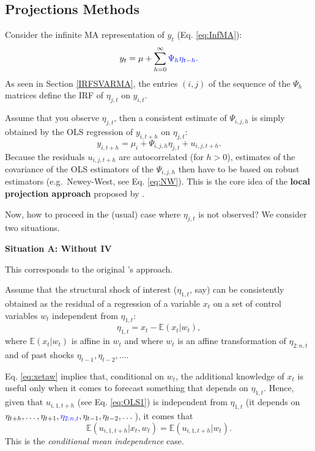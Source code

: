 \documentclass[
]{book}
\theoremstyle{definition}
\theoremstyle{definition}
\theoremstyle{definition}
\theoremstyle{definition}
\theoremstyle{remark}
\begin{document}
\hypertarget{Projections}{%
\subsection{Projections Methods}\label{Projections}}

Consider the infinite MA representation of \(y_t\) (Eq. \eqref{eq:InfMA}):
\[
y_t = \mu + \sum_{h=0}^\infty \color{blue}{\Psi_{h}} \eta_{t-h}.
\]
As seen in Section \ref{IRFSVARMA}, the entries \((i,j)\) of the sequence of the \(\Psi_h\) matrices define the IRF of \(\eta_{j,t}\) on \(y_{i,t}\).

Assume that you observe \(\eta_{j,t}\), then a consistent estimate of \(\Psi_{i,j,h}\) is simply obtained by the OLS regression of \(y_{i,t+h}\) on \(\eta_{j,t}\):
\begin{equation}
y_{i,t+h} = \mu_i + \Psi_{i,j,h}\eta_{j,t} + u_{i,j,t+h}.\label{eq:OLS1}
\end{equation}
Because the residuals \(u_{i,j,t+h}\) are autocorrelated (for \(h>0\)), estimates of the covariance of the OLS estimators of the \(\Psi_{i,j,h}\) then have to be based on robust estimators (e.g.~Newey-West, see Eq. \eqref{eq:NW}). This is the core idea of the \textbf{local projection approach} proposed by \citet{Jorda_2005}.

Now, how to proceed in the (usual) case where \(\eta_{j,t}\) is not observed? We consider two situations.

\textbf{Situation A: Without IV}

This corresponds to the original \citet{Jorda_2005}'s approach.

Assume that the structural shock of interest (\(\eta_{1,t}\), say) can be consistently obtained as the residual of a regression of a variable \(x_t\) on a set of control variables \(w_t\) independent from \(\eta_{1,t}\):
\begin{equation}
\eta_{1,t} = x_t - \mathbb{E}(x_t|w_t),\label{eq:xetaw}
\end{equation}
where \(\mathbb{E}(x_t|w_t)\) is affine in \(w_t\) and where \(w_t\) is an affine transformation of \(\eta_{2:n,t}\) and of past shocks \(\eta_{t-1},\eta_{t-2},\dots\).

Eq. \eqref{eq:xetaw} implies that, conditional on \(w_t\), the additional knowledge of \(x_t\) is useful only when it comes to forecast something that depends on \(\eta_{1,t}\). Hence, given that \(u_{i,1,t+h}\) (see Eq. \eqref{eq:OLS1}) is independent from \(\eta_{1,t}\) (it depends on \(\eta_{t+h},\dots,\eta_{t+1},{\color{blue}\eta_{2:n,t}},\eta_{t-1},\eta_{t-2},\dots\)), it comes that
\[
\mathbb{E}(u_{i,1,t+h}|x_t,w_t)= \mathbb{E}(u_{i,1,t+h}|w_t).
\]
This is the \emph{conditional mean independence} case.
\end{document}

